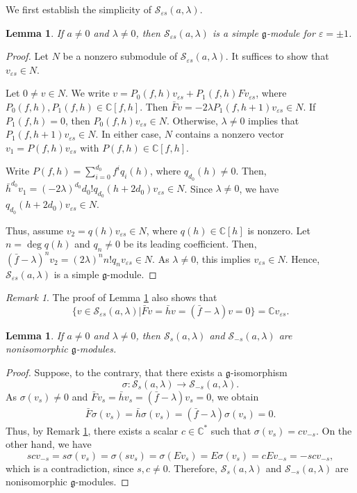 \documentclass[a4paper,10pt]{article}
\theoremstyle{definition}
\theoremstyle{plain}
\newtheorem{lemma}[definition]{Lemma}
\theoremstyle{remark}
\newtheorem{remark}[definition]{Remark}
\theoremstyle{mystyle}
\numberwithin{equation}{section}
\begin{document}
    We first establish the simplicity of $\mathcal {S}_{\varepsilon s}(a,\lambda)$.
\begin{lemma}\label{xisi}
    If $a\ne 0$ and $\lambda\neq0$, then $\mathcal {S}_{\varepsilon s}(a,\lambda)$ is a simple $\mathfrak g$-module for $\varepsilon=\pm 1$. 
\end{lemma}
\begin{proof}
    Let $N$ be a nonzero submodule of $\mathcal {S}_{\varepsilon s}(a,\lambda)$. It suffices to show that \(v_{\varepsilon s}\in N\).
    
    Let $0\neq v\in N$. We write $v=P_0(f,h)v_{\varepsilon s}+P_1(f,h)Fv_{\varepsilon s}$, where $P_0(f,h),P_1(f,h)\in \mathbb C[f,h]$. Then $\bar Fv=-2\lambda P_1(f,h+1)v_{\varepsilon s}\in N$. 
    If \(P_1(f,h)=0\), then \(P_0(f,h)v_{\varepsilon s}\in N\). Otherwise, \(\lambda\ne0\) implies that \(P_1(f,h+1)v_{\varepsilon s}\in N\). In either case, \(N\) contains a nonzero vector \(v_1=P(f,h)v_{\varepsilon s}\) with \(P(f,h)\in\mathbb C[f,h]\).
    
    Write $P(f,h)=\sum_{i=0}^{d_0}f^iq_i(h)$, where $q_{d_0}(h)\neq 0$. Then, $\bar h^{d_0}v_1=(-2\lambda)^{d_0}d_0!q_{d_0}(h+2d_0)v_{\varepsilon s}\in N$. Since $\lambda\neq 0$, we have $q_{d_0}(h+2d_0)v_{\varepsilon s}\in N$. 
    
    Thus, assume $v_2=q(h)v_{\varepsilon s}\in N$, where $q(h)\in \mathbb C[h]$ is nonzero. Let $n=\deg q(h)$ and $q_n\neq 0$ be its leading coefficient. Then, $(\bar f-\lambda)^nv_2=(2\lambda)^nn!q_nv_{\varepsilon s}\in N$. As $\lambda\neq 0$, this implies $v_{\varepsilon s}\in N$. Hence, $\mathcal {S}_{\varepsilon s}(a,\lambda)$ is a simple $\mathfrak g$-module.
\end{proof}
\begin{remark}\label{ves}
    The proof of Lemma \ref{xisi} also shows that 
    $$\{v\in \mathcal {S}_{\varepsilon s}(a,\lambda)|\bar Fv=\bar hv=(\bar f-\lambda)v=0\}=\mathbb Cv_{\varepsilon s}.$$
\end{remark}
\begin{lemma}\label{ncong}
    If $a\ne0$ and $\lambda\neq 0$, then $\mathcal {S}_{s}(a,\lambda)$ and $\mathcal {S}_{-s}(a,\lambda)$ are nonisomorphic $\mathfrak g$-modules.
\end{lemma}
\begin{proof}
    Suppose, to the contrary, that there exists a $\mathfrak g$-isomorphism
    $$
    \sigma:\mathcal {S}_{s}(a,\lambda)\to \mathcal {S}_{-s}(a,\lambda).
    $$
    As $\sigma(v_{s})\neq 0$ and $\bar Fv_{s}=\bar hv_{s}=(\bar f-\lambda)v_{s}=0$, we obtain
    \begin{align*}
        \bar F\sigma(v_s)=\bar h\sigma(v_s)=(\bar f-\lambda)\sigma(v_s)=0.
    \end{align*}
    Thus, by Remark \ref{ves}, there exists a scalar $c\in \mathbb C^*$ such that $\sigma(v_{s})=cv_{-s}$. On the other hand, we have 
    $$
    scv_{-s}=s\sigma(v_{s})=\sigma(sv_s)=\sigma(Ev_s)=E\sigma(v_{s})=cEv_{-s}=-scv_{-s},
    $$
    which is a contradiction, since $s,c\neq 0$. Therefore, $\mathcal {S}_{s}(a,\lambda)$ and $\mathcal {S}_{-s}(a,\lambda)$ are nonisomorphic $\mathfrak g$-modules.
\end{proof}
\end{document}
